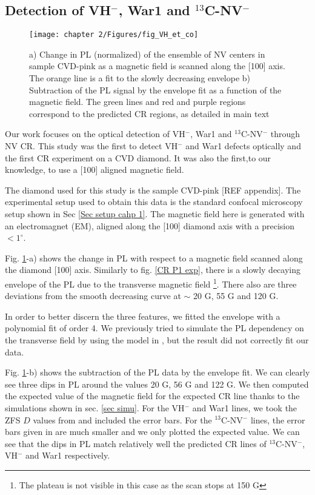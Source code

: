 \documentclass[a4paper, 11pt]{book}
\begin{document}
\subsection{Detection of VH$^-$, War1 and $^{13}$C-NV$^-$}

\begin{figure}[h]
\centering
\texttt{[image: chapter 2/Figures/fig\_VH\_et\_co]}
\caption{a) Change in PL (normalized) of the ensemble of NV centers in sample CVD-pink as a magnetic field is scanned along the [100] axis. The orange line is a fit to the slowly decreasing envelope b) Subtraction of the PL signal by the envelope fit as a function of the magnetic field. The green lines and red and purple regions correspond to the predicted CR regions, as detailed in main text}
\label{CR VH exp}
\end{figure}

Our work \citep{pellet2021optical} focuses on the optical detection of VH$^-$, War1 and $^{13}$C-NV$^-$ through NV CR. This study was the first to detect VH$^-$ and War1 defects optically and the first CR experiment on a CVD diamond. It was also the first,to our knowledge, to use a [100] aligned magnetic field.

The diamond used for this study is the sample CVD-pink [REF appendix]. The experimental setup used to obtain this data is the standard confocal microscopy setup shown in Sec \ref{Sec setup cahp 1}. The magnetic field here is generated with an electromagnet (EM), aligned along the [100] diamond axis with a precision $<1^\circ$. 

Fig. \ref{CR VH exp}-a) shows the change in PL with respect to a magnetic field scanned along the diamond [100] axis. Similarly to fig. \ref{CR P1 exp}, there is a slowly decaying envelope of the PL due to the transverse magnetic field \footnote{The plateau is not visible in this case as the scan stops at 150 G}. There also are three deviations from the smooth decreasing curve at $\sim$ 20 G, 55 G and 120 G.

In order to better discern the three features, we fitted the envelope with a polynomial fit of order 4. We previously tried to simulate the PL dependency on the transverse field  by using the model in \citep{tetienne2012magnetic}, but the result did not correctly fit our data.

Fig. \ref{CR VH exp}-b) shows the subtraction of the PL data by the envelope fit. We can clearly see three dips in PL around the values 20 G, 56 G and 122 G. We then computed the expected value of the magnetic field for the expected CR line thanks to the simulations shown in sec. \ref{sec simu}. For the VH$^-$ and War1 lines, we took the ZFS $D$ values from \citep{cruddace2007magnetic} and included the error bars. For the $^{13}$C-NV$^-$ lines, the error bars given in \citep{simanovskaia2013sidebands} are much smaller and we only plotted the expected value. We can see that the dips in PL match relatively well the predicted CR lines of $^{13}$C-NV$^-$, VH$^-$ and War1 respectively.
\end{document}
